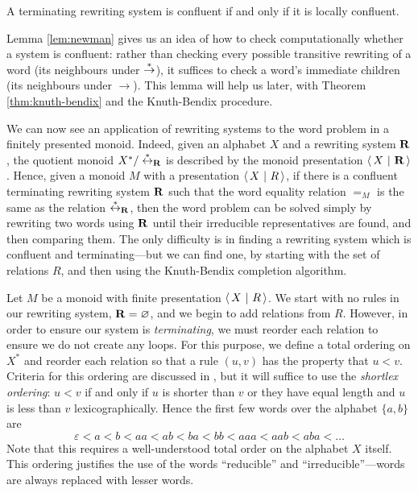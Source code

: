 \begin{lemma} %
  \label{lem:newman}
  A terminating rewriting system is confluent if and only if it is locally
  confluent.
\end{lemma}

Lemma \ref{lem:newman} gives us an idea of how to check computationally whether
a system is confluent: rather than checking every possible transitive rewriting
of a word (its neighbours under $\stackrel{*}{\to}$), it suffices to check a word's
immediate children (its neighbours under $\to$).  This lemma will help us later,
with Theorem \ref{thm:knuth-bendix} and the Knuth-Bendix procedure.

We can now see an application of rewriting systems to the word problem in a
finitely presented monoid.  Indeed, given an alphabet $X$ and a rewriting system
$\mathbf{R}$, the quotient monoid $X^* / \stackrel{*}{\leftrightarrow}_{\mathbf{R}}$ is described by the
monoid presentation $\left\langle\,X ~\middle|~ \mathbf{R}\,\right\rangle$.  Hence, given a monoid $M$ with a
presentation $\left\langle\,X ~\middle|~ R\,\right\rangle$, if there is a confluent terminating rewriting system
$\mathbf{R}$ such that the word equality relation $=_M$ is the same as the
relation $\stackrel{*}{\leftrightarrow}_{\mathbf{R}}$, then the word problem can be solved
simply by rewriting two words using $\mathbf{R}$ until their irreducible
representatives are found, and then comparing them.  The only difficulty is in
finding a rewriting system which is confluent and terminating---but we can find
one, by starting with the set of relations $R$, and then using the Knuth-Bendix
completion algorithm.

Let $M$ be a monoid with finite presentation $\left\langle\,X ~\middle|~ R\,\right\rangle$.
We start with no rules in our rewriting system, $\mathbf{R} = \varnothing$, and
we begin to add relations from $R$.  However, in order to ensure our system is
\textit{terminating}, we must reorder each relation to ensure we do not create
any loops.  For this purpose, we define a total ordering on $X^*$ and reorder
each relation so that a rule $(u, v)$ has the property that $u < v$.  Criteria
for this ordering are discussed in \cite[p.~420]{cgt}, but it will suffice to
use the \textit{shortlex ordering}: $u < v$ if and only if $u$ is shorter than
$v$ or they have equal length and $u$ is less than $v$ lexicographically.  Hence the
first few words over the alphabet $\{a, b\}$ are
$$\varepsilon < a < b < aa < ab < ba < bb < aaa < aab < aba < \ldots$$
Note that this requires a well-understood total order on the alphabet $X$
itself.  This ordering justifies the use of the words ``reducible'' and
``irreducible''---words are always replaced with lesser words.

